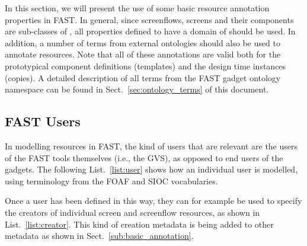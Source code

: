 \documentclass[twoside]{fast_latex}
\begin{document}
In this section, we will present the use of some basic resource annotation properties in FAST. In general, since screenflows, screens and their components are sub-classes of , all properties defined to have a domain of  should be used. In addition, a number of terms from external ontologies should also be used to annotate resources. Note that all of these annotations are valid both for the prototypical component definitions (templates) and the design time instances (copies). A detailed description of all terms from the FAST gadget ontology namespace can be found in Sect.~\ref{sec:ontology_terms} of this document.

\singlespacing
{}
\begin{figure}
	
\end{figure}
\doublespacing


\subsection{FAST Users} %
\label{sub:fast_users}

In modelling resources in FAST, the kind of users that are relevant are the users of the FAST tools themselves (i.e., the GVS), as opposed to end users of the gadgets. The following List.~\ref{list:user} shows how an individual user is modelled, using terminology from the FOAF and SIOC vocabularies.

\singlespacing
{}
\begin{figure}
	
\end{figure}
\doublespacing

Once a user has been defined in this way, they can for example be used to specify the creators of individual screen and screenflow resources, as shown in List.~\ref{list:creator}. This kind of creation metadata is being added to other metadata as shown in Sect.~\ref{sub:basic_annotation}.

\singlespacing
{}
\begin{figure}
	
\end{figure}
\doublespacing
\end{document}
